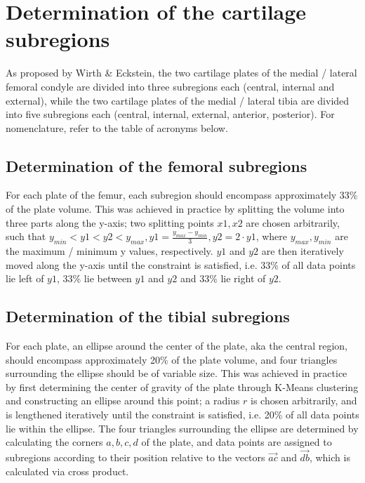 \section{Determination of the cartilage subregions}
\label{sec:Subregions}
As proposed by Wirth \& Eckstein, the two cartilage plates of the medial / lateral femoral condyle are divided into three subregions each (central, internal and external), while the two cartilage plates of the medial / lateral tibia are divided into five subregions each (central, internal, external, anterior, posterior). For nomenclature, refer to the table of acronyms below. 
\subsection{Determination of the femoral subregions}
For each plate of the femur, each subregion should encompass approximately 33\% of the plate volume. This was achieved in practice by splitting the volume into three parts along the y-axis; two splitting points $x1, x2$ are chosen arbitrarily, such that $y_{min} < y1 < y2 < y_{max}, y1 = \frac{y_{max} - y_{min}}{3}, y2 = 2 \cdot y1$, where $y_{max}, y_{min}$ are the maximum / minimum y values, respectively. $y1$ and $y2$ are then iteratively moved along the y-axis until the constraint is satisfied, i.e. 33\% of all data points lie left of $y1$, 33\% lie between $y1$ and $y2$ and 33\% lie right of $y2$.
\subsection{Determination of the tibial subregions}
For each plate, an ellipse around the center of the plate, aka the central region, should encompass approximately 20\% of the plate volume, and four triangles surrounding the ellipse should be of variable size. This was achieved in practice by first determining the center of gravity of the plate through K-Means clustering and constructing an ellipse around this point; a radius $r$ is chosen arbitrarily, and is lengthened iteratively until the constraint is satisfied, i.e. 20\% of all data points lie within the ellipse. The four triangles surrounding the ellipse are determined by calculating the corners $a, b, c, d$ of the plate, and data points are assigned to subregions according to their position relative to the vectors $\vec{ac}$ and $\vec{db}$, which is calculated via cross product.

